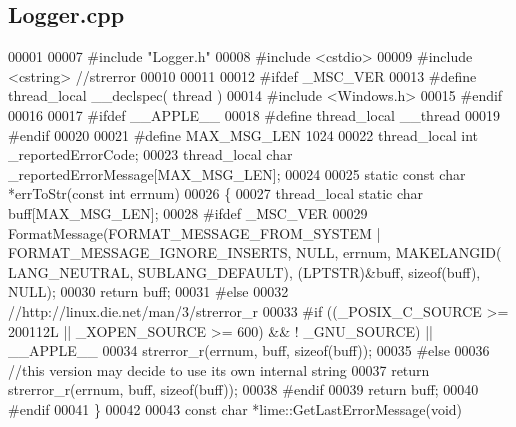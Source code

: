\subsection{Logger.\+cpp}
\label{Logger_8cpp_source}

\begin{DoxyCode}
00001 
00007 \textcolor{preprocessor}{#include "Logger.h"}
00008 \textcolor{preprocessor}{#include <cstdio>}
00009 \textcolor{preprocessor}{#include <cstring>} \textcolor{comment}{//strerror}
00010 
00011 
00012 \textcolor{preprocessor}{#ifdef \_MSC\_VER}
00013 \textcolor{preprocessor}{    #define thread\_local \_\_declspec( thread )}
00014 \textcolor{preprocessor}{    #include <Windows.h>}
00015 \textcolor{preprocessor}{#endif}
00016 
00017 \textcolor{preprocessor}{#ifdef \_\_APPLE\_\_}
00018 \textcolor{preprocessor}{    #define thread\_local \_\_thread}
00019 \textcolor{preprocessor}{#endif}
00020 
00021 \textcolor{preprocessor}{#define MAX\_MSG\_LEN 1024}
00022 thread\_local \textcolor{keywordtype}{int} _reportedErrorCode;
00023 thread\_local \textcolor{keywordtype}{char} _reportedErrorMessage[MAX_MSG_LEN];
00024 
00025 \textcolor{keyword}{static} \textcolor{keyword}{const} \textcolor{keywordtype}{char} *errToStr(\textcolor{keyword}{const} \textcolor{keywordtype}{int} errnum)
00026 \{
00027     thread\_local \textcolor{keyword}{static} \textcolor{keywordtype}{char} buff[MAX_MSG_LEN];
00028 \textcolor{preprocessor}{    #ifdef \_MSC\_VER}
00029     FormatMessage(FORMAT\_MESSAGE\_FROM\_SYSTEM | FORMAT\_MESSAGE\_IGNORE\_INSERTS, NULL, errnum, MAKELANGID(
      LANG\_NEUTRAL, SUBLANG\_DEFAULT), (LPTSTR)&buff, \textcolor{keyword}{sizeof}(buff), NULL);
00030     \textcolor{keywordflow}{return} buff;
00031 \textcolor{preprocessor}{    #else}
00032     \textcolor{comment}{//http://linux.die.net/man/3/strerror\_r}
00033 \textcolor{preprocessor}{    #if ((\_POSIX\_C\_SOURCE >= 200112L || \_XOPEN\_SOURCE >= 600) && ! \_GNU\_SOURCE) || \_\_APPLE\_\_}
00034     strerror\_r(errnum, buff, \textcolor{keyword}{sizeof}(buff));
00035 \textcolor{preprocessor}{    #else}
00036     \textcolor{comment}{//this version may decide to use its own internal string}
00037     \textcolor{keywordflow}{return} strerror\_r(errnum, buff, \textcolor{keyword}{sizeof}(buff));
00038 \textcolor{preprocessor}{    #endif}
00039     \textcolor{keywordflow}{return} buff;
00040 \textcolor{preprocessor}{    #endif}
00041 \}
00042 
00043 \textcolor{keyword}{const} \textcolor{keywordtype}{char} *lime::GetLastErrorMessage(\textcolor{keywordtype}{void})

\end{DoxyCode}

